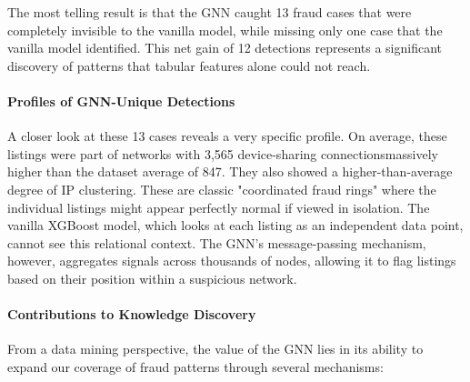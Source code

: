 The most telling result is that the GNN caught 13 fraud cases that were completely invisible to the vanilla model, while missing only one case that the vanilla model identified. This net gain of 12 detections represents a significant discovery of patterns that tabular features alone could not reach.

\paragraph{Profiles of GNN-Unique Detections}

A closer look at these 13 cases reveals a very specific profile. On average, these listings were part of networks with 3,565 device-sharing connectionsmassively higher than the dataset average of 847. They also showed a higher-than-average degree of IP clustering. These are classic "coordinated fraud rings" where the individual listings might appear perfectly normal if viewed in isolation. The vanilla XGBoost model, which looks at each listing as an independent data point, cannot see this relational context. The GNN's message-passing mechanism, however, aggregates signals across thousands of nodes, allowing it to flag listings based on their position within a suspicious network.

\paragraph{Contributions to Knowledge Discovery}

From a data mining perspective, the value of the GNN lies in its ability to expand our coverage of fraud patterns through several mechanisms:

